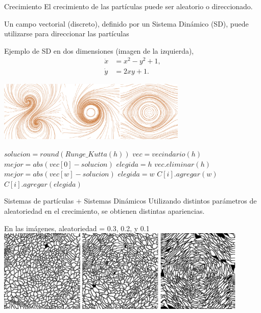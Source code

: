 \documentclass[spanish]{beamer}
\begin{document}
\begin{frame}{Crecimiento}
El crecimiento de las partículas puede ser aleatorio o direccionado.

Un campo vectorial (discreto), definido por un Sistema Dinámico (SD), puede utilizarse para direccionar las partículas 

Ejemplo de SD en dos dimensiones (imagen de la izquierda),
\begin{equation*} \label{eq:simple}  
  \begin{aligned}
    \dot{x} &= x^{2}-y^{2}+1,\\
    \dot{y} &= 2xy+1.
  \end{aligned}
\end{equation*}
  \centerline{\includegraphics[width=9cm]{../figures/Fig2}}
\end{frame}

\begin{frame}
\begin{algorithm}[H]
\begin{algorithmic}[1]
\STATE $solucion = round(Runge\_Kutta(h))$
\STATE $vec = vecindario(h)$
\STATE $mejor = abs(vec[0] - solucion)$
\STATE $elegida = h$
\STATE $vec.eliminar(h)$
        \STATE $mejor = abs(vec[w]-solucion)$
        \STATE $elegida = w$
    \ENDIF
        \STATE $C[i].agregar(w)$
    \ENDIF
\ENDFOR
\STATE $C[i].agregar(elegida)$
\end{algorithmic}
\end{algorithm}
\end{frame}

\begin{frame}{Sistemas de partículas + Sistemas Dinámicos}
Utilizando distintos parámetros de aleatoriedad en el crecimiento, se obtienen distintas apariencias.

En las imágenes, aleatoriedad = 0.3, 0.2, y 0.1
  \includegraphics[width=12cm]{../figures/Fig3}
\end{frame}
\end{document}
